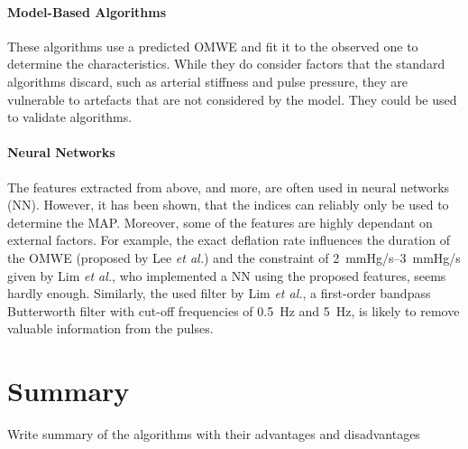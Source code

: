 \paragraph{Model-Based Algorithms} These algorithms use a predicted OMWE and fit it to the observed one to determine the characteristics. While they do consider factors that the standard algorithms discard, such as arterial stiffness and pulse pressure, they are vulnerable to artefacts that are not considered by the model. They could be used to validate algorithms. \cite{Babbs2012}

\paragraph{Neural Networks} The features extracted from above, and more, are often used in neural networks (NN). However, it has been shown, that the indices can reliably only be used to determine the MAP. Moreover, some of the features are highly dependant on external factors. For example, the exact deflation rate influences the duration of the OMWE (proposed by Lee \textit{et al.}\cite{Lee2013}) and the constraint of \SIrange{2}{3}{\mmHg/\second} given by Lim \textit{et al.}\cite{Lim2015}, who implemented a NN using the proposed features, seems hardly enough. Similarly, the used filter by Lim \textit{et al.}, a first-order bandpass Butterworth filter with cut-off frequencies of \SI{0.5}{\Hz} and \SI{5}{\Hz}, is likely to remove valuable information from the pulses.

\section{Summary}
Write summary of the algorithms with their advantages and disadvantages
